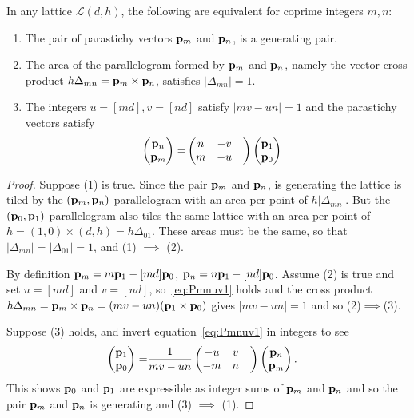 \begin{theorem}
\label{thm:gLattice}
\label{thm:glattice}
	In any lattice $\mathcal{L}(d,h)$, the following are equivalent for coprime integers $m,n$:
	\begin{enumerate}
			\item The pair of parastichy vectors ${\mathbf p}_{m}$ and ${\mathbf p}_{n}$, is a generating pair.
\item The area of the parallelogram formed by ${\mathbf p}_{m}$ and ${\mathbf p}_{n}$, namely the vector cross product $h\Delta_{mn}={\mathbf p}_{m}\times{\mathbf p}_{n}$, satisfies
$|\Delta_{mn}|=1$. 	
		\item The integers $u=[md],v=[nd]$ satisfy $|mv-un|=1$ and the parastichy vectors	
		 satisfy 
	\begin{align}\label{eq:Pmnuv1}
			\begin{pmatrix}
			{\mathbf p}_{n} \\ {\mathbf p}_{m} 
		\end{pmatrix} = &
		\begin{pmatrix}
		n & - v 
		\\
		m &- u &
			\end{pmatrix}
		\begin{pmatrix}
			{\mathbf p}_{1}
			\\
			{\mathbf p}_{0}
		\end{pmatrix}
	\end{align}
	\end{enumerate}
\end{theorem}
\begin{proof}
	Suppose (1) is true. Since the pair  ${\mathbf p}_{m}$ and ${\mathbf p}_{n}$, is generating the lattice is tiled
	by the $({\mathbf p}_{m},{\mathbf p}_{n})$ parallelogram with an area per point of $h|\Delta_{mn}|$. But  the $({\mathbf p}_{0},{\mathbf p}_{1})$ parallelogram also tiles the same lattice with an area per point of $h= (1,0)\times(d,h)=h\Delta_{01}$. These areas must be the same, so that $|\Delta_{mn}|=|\Delta_{01}|=1$, and (1) $\implies$ (2). 
	
By definition ${\mathbf p}_{m}=m{\mathbf p}_{1}- [md]{\mathbf p}_{0}$,  ${\mathbf p}_{n}=n{\mathbf p}_{1}-[nd]{\mathbf p}_{0}$. Assume (2) is true  and set $u=[md]$ and $v=[nd]$, so~\eqref{eq:Pmnuv1} holds 
		and the cross product $h\Delta_{mn}={\mathbf p}_{m}\times{\mathbf p}_{n}=(m v - u n) ({\mathbf p}_{1} \times {\mathbf p}_{0})$ gives $|m v-un|=1$ and so
	 (2)$\implies$(3). 

Suppose (3) holds, and invert equation~\eqref{eq:Pmnuv1} in integers to see
	\begin{align}	
		\label{eq:Pmnuv2}
		\begin{pmatrix}
			{\mathbf p}_{1}
			\\
			{\mathbf p}_{0}
		\end{pmatrix} = &\frac{1}{m v - u n}
		\begin{pmatrix}
			-u &  v 
			\\
			-m & n &
		\end{pmatrix}
		\begin{pmatrix}
			{\mathbf p}_{n} \\ {\mathbf p}_{m} 
		\end{pmatrix}. 
	\end{align}
This shows  ${\mathbf p}_{0}$ and ${\mathbf p}_{1}$ are expressible as integer sums of ${\mathbf p}_{m}$ and ${\mathbf p}_{n}$ and so the pair  ${\mathbf p}_{m}$ and ${\mathbf p}_{n}$ is generating and (3) $\implies$ (1). 

\end{proof}
